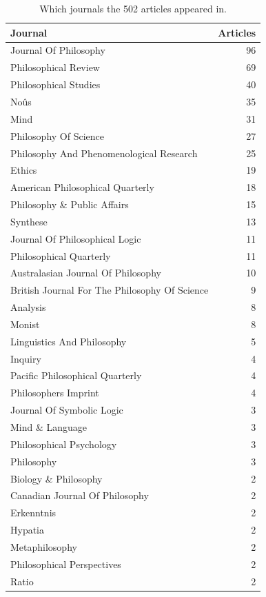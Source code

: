 \documentclass[
  10pt,
  letterpaper,
  DIV=11,
  numbers=noendperiod,
  twoside]{scrartcl}
\begin{document}
\begin{longtable}[]{@{}lr@{}}

\caption{\label{tbl-journals-in-main-bib}Which journals the 502 articles
appeared in.}

\tabularnewline

\toprule\noalign{}
Journal & Articles \\
\midrule\noalign{}
\endhead
\bottomrule\noalign{}
\endlastfoot
Journal Of Philosophy & 96 \\
Philosophical Review & 69 \\
Philosophical Studies & 40 \\
Noûs & 35 \\
Mind & 31 \\
Philosophy Of Science & 27 \\
Philosophy And Phenomenological Research & 25 \\
Ethics & 19 \\
American Philosophical Quarterly & 18 \\
Philosophy \& Public Affairs & 15 \\
Synthese & 13 \\
Journal Of Philosophical Logic & 11 \\
Philosophical Quarterly & 11 \\
Australasian Journal Of Philosophy & 10 \\
British Journal For The Philosophy Of Science & 9 \\
Analysis & 8 \\
Monist & 8 \\
Linguistics And Philosophy & 5 \\
Inquiry & 4 \\
Pacific Philosophical Quarterly & 4 \\
Philosophers Imprint & 4 \\
Journal Of Symbolic Logic & 3 \\
Mind \& Language & 3 \\
Philosophical Psychology & 3 \\
Philosophy & 3 \\
Biology \& Philosophy & 2 \\
Canadian Journal Of Philosophy & 2 \\
Erkenntnis & 2 \\
Hypatia & 2 \\
Metaphilosophy & 2 \\
Philosophical Perspectives & 2 \\
Ratio & 2 \\

\end{longtable}
\end{document}
